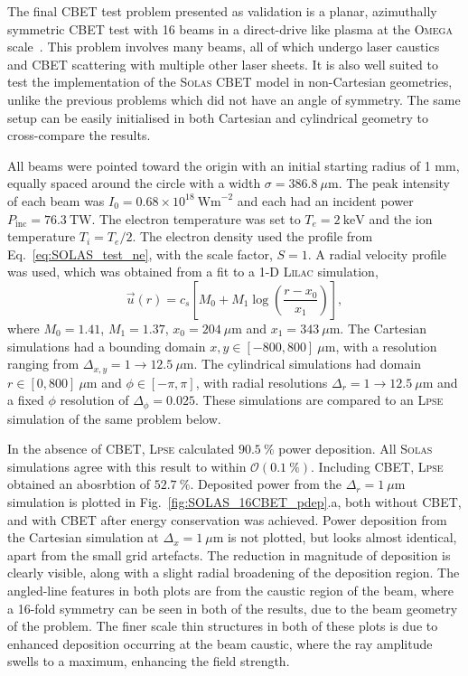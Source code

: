 The final \ac{CBET} test problem presented as validation is a planar, azimuthally symmetric \ac{CBET} test with 16 beams in a direct-drive like plasma at the \textsc{Omega} scale~\cite{follett_validation_2022}.
This problem involves many beams, all of which undergo laser caustics and \ac{CBET} scattering with multiple other laser sheets.
It is also well suited to test the implementation of the \textsc{Solas} \ac{CBET} model in non-Cartesian geometries, unlike the previous problems which did not have an angle of symmetry.
The same setup can be easily initialised in both Cartesian and cylindrical geometry to cross-compare the results.

All beams were pointed toward the origin with an initial starting radius of 1 $\text{mm}$, equally spaced around the circle with a width $\sigma=386.8\ \mu\text{m}$.
The peak intensity of each beam was $I_0=0.68\times10^{18}\ \text{Wm}^{-2}$ and each had an incident power $P_{\text{inc}}=76.3\ \text{TW}$.
The electron temperature was set to $T_e = 2\ \text{keV}$ and the ion temperature $T_i = T_e/2$.
The electron density used the profile from Eq.~\ref{eq:SOLAS_test_ne}, with the scale factor, $S=1$.
A radial velocity profile was used, which was obtained from a fit to a 1-D \textsc{Lilac} simulation,
\begin{equation}
    \vec{u}(r) = c_s \left[ M_0 + M_1 \log\left( \frac{r-x_0}{x_1} \right) \right],
\end{equation}
where $M_0 = 1.41$, $M_1=1.37$, $x_0=204\ \mu\text{m}$ and $x_1=343\ \mu\text{m}$.
The Cartesian simulations had a bounding domain $x,y\in[-800,800]\ \mu\text{m}$, with a resolution ranging from $\Delta_{x,y}=1\rightarrow 12.5\ \mu\text{m}$.
The cylindrical simulations had domain $r\in[0,800]\ \mu\text{m}$ and $\phi\in[-\pi,\pi]$, with radial resolutions $\Delta_{r}=1\rightarrow 12.5\ \mu\text{m}$ and a fixed $\phi$ resolution of $\Delta_{\phi}=0.025$.
These simulations are compared to an \textsc{Lpse} simulation of the same problem below.

In the absence of \ac{CBET}, \textsc{Lpse} calculated $90.5\  \%$ power deposition.
All \textsc{Solas} simulations agree with this result to within $\mathcal{O}(0.1\ \%)$.
Including \ac{CBET}, \textsc{Lpse} obtained an abosrbtion of $52.7\ \%$.
Deposited power from the $\Delta_r=1\ \mu\text{m}$ simulation is plotted in Fig.~\ref{fig:SOLAS_16CBET_pdep}.a, both without \ac{CBET}, and with \ac{CBET} after energy conservation was achieved.
Power deposition from the Cartesian simulation at $\Delta_x=1\ \mu\text{m}$ is not plotted, but looks almost identical, apart from the small grid artefacts.
The reduction in magnitude of deposition is clearly visible, along with a slight radial broadening of the deposition region.
The angled-line features in both plots are from the caustic region of the beam, where a 16-fold symmetry can be seen in both of the results, due to the beam geometry of the problem.
The finer scale thin structures in both of these plots is due to enhanced deposition occurring at the beam caustic, where the ray amplitude swells to a maximum, enhancing the field strength.

